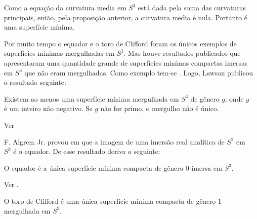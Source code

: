 \begin{demonstracao}
	Como a equação da curvatura media em $S^3$ está dada pela soma das curvaturas principais, então, pela proposição anterior, a curvatura media é nula. Portanto é uma superfície mínima.
\end{demonstracao}


Por muito tempo o equador e o toro de Clifford foram os únicos exemplos de superfícies mínimas mergulhadas em $S^3$. Mas houve resultados publicados que apresentaram uma quantidade grande de superfícies minímas compactas imersas em $S^3$ que não eram mergulhadas. Como exemplo tem-se \cite{Lawson1969}. Logo, Lawson publicou o resultado seguinte:

\begin{teorema}[Lawson]
	Existem ao menos uma superfície mínima mergulhada em $S^3$ de gênero $g$, onde $g$ é um inteiro não negativo. Se $g$ não for primo, o mergulho não é único.
\end{teorema}

\begin{demonstracao}
	Ver \cite[Theorem 2]{Lawson1970}
\end{demonstracao}



F. Algrem Jr. provou em \cite{Almgren1966} que a imagem de uma imersão real analítica de $S^2$ em $S^3$ é o equador. De esse resultado deriva o seguinte:

\begin{teorema}[Almgren]
	O equador é a única superfície mínima compacta de gênero 0 imersa em $S^3$.
\end{teorema}

\begin{demonstracao}
	Ver \cite[Lemma 1]{Almgren1966}.
\end{demonstracao}

\begin{teorema}
	O toro de Clifford é uma única superfície mínima compacta de gênero 1 mergulhada  em $S^3$.
\end{teorema}

